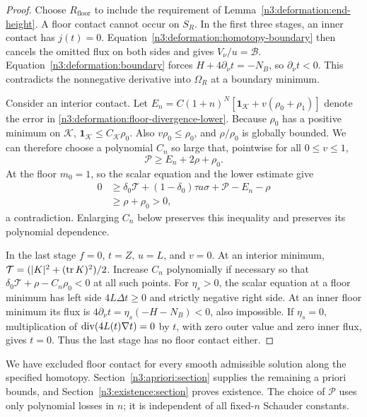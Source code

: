 \begin{proof}
Choose $R_{\mathrm{floor}}$ to include the requirement of
Lemma~\ref{n3:deformation:end-height}. A floor contact cannot occur on $S_R$.
In the first three stages, an inner contact has $j(t)=0$.
Equation~\eqref{n3:deformation:homotopy-boundary} then cancels the omitted
flux on both sides and gives $V_\nu/u=\mathcal B$.
Equation~\eqref{n3:deformation:boundary} forces
$H+4\partial_\nu t=-N_B$, so $\partial_\nu t<0$.
This contradicts the nonnegative derivative into $\Omega_R$ at a
boundary minimum.

Consider an interior contact. Let
$E_n=C(1+n)^N[\mathbf1_{\mathcal K}+v(\rho_0+\rho_1)]$
denote the error in \eqref{n3:deformation:floor-divergence-lower}.
Because $\rho_0$ has a positive minimum on $\mathcal K$,
$\mathbf1_{\mathcal K}\le C_{\mathcal K}\rho_0$.
Also $v\rho_0\le\rho_0$, and $\rho/\rho_0$ is globally bounded.
We can therefore choose a polynomial $C_n$ so large that, pointwise
for all $0\le v\le1$,
\begin{equation}\label{n3:deformation:penalty-choice}
 \mathcal P\ge E_n+2\rho+\rho_0.
\end{equation}
At the floor $m_0=1$, so the scalar equation and the lower estimate give
\[
 \begin{split}
 0
 &\ge \delta_0\mathcal T+(1-\delta_0)\tau a\sigma
                     +\mathcal P-E_n-\rho\\
 &\ge \rho+\rho_0>0,
 \end{split}
\]
a contradiction. Enlarging $C_n$ below preserves this inequality and
preserves its polynomial dependence.

In the last stage $f=0$, $t=Z$, $u=L$, and $v=0$.
At an interior minimum,
$\mathcal T=(|K|^2+(\operatorname{tr} K)^2)/2$.
Increase $C_n$ polynomially if necessary so that
$\delta_0\mathcal T+\rho-C_n\rho_0<0$ at all such points.
For $\eta_s>0$, the scalar equation at a floor minimum has left side
$4L\Delta t\ge0$ and strictly negative right side.
At an inner floor minimum its flux is
$4\partial_\nu t=\eta_s(-H-N_B)<0$, also impossible.
If $\eta_s=0$, multiplication of
$\operatorname{div}(4L(t)\nabla t)=0$ by $t$, with zero outer value and zero inner
flux, gives $t=0$.
Thus the last stage has no floor contact either.
\end{proof}

We have excluded floor contact for every smooth admissible solution
along the specified homotopy. Section~\ref{n3:apriori:section} supplies the
remaining a priori bounds, and Section~\ref{n3:existence:section} proves
existence. The choice of $\mathcal P$ uses only polynomial losses in $n$;
it is independent of all fixed-$n$ Schauder constants.
